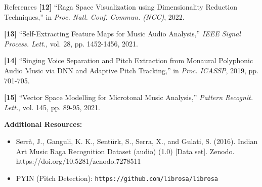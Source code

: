 \documentclass[aspectratio=169,11pt]{beamer}
\begin{document}
\begin{frame}[allowframebreaks]{References}
		\textbf{[12]} ``Raga Space Visualization using Dimensionality Reduction Techniques,'' in \textit{Proc. Natl. Conf. Commun. (NCC)}, 2022.
		
		\textbf{[13]} ``Self-Extracting Feature Maps for Music Audio Analysis,'' \textit{IEEE Signal Process. Lett.}, vol. 28, pp. 1452-1456, 2021.
		
		\textbf{[14]} ``Singing Voice Separation and Pitch Extraction from Monaural Polyphonic Audio Music via DNN and Adaptive Pitch Tracking,'' in \textit{Proc. ICASSP}, 2019, pp. 701-705.
		
		\textbf{[15]} ``Vector Space Modelling for Microtonal Music Analysis,'' \textit{Pattern Recognit. Lett.}, vol. 145, pp. 89-95, 2021.
		
		\vspace{0.5cm}
		
		\textbf{Additional Resources:}
		\begin{itemize}
			\item Serrà, J., Ganguli, K. K., Sentürk, S., Serra, X., and Gulati, S. (2016). Indian Art Music Raga Recognition Dataset (audio) (1.0) [Data set]. Zenodo. https://doi.org/10.5281/zenodo.7278511
			\item PYIN (Pitch Detection): \texttt{https://github.com/librosa/librosa}
		\end{itemize}
	\end{frame}
	
\end{document}
